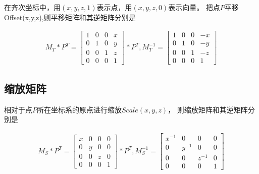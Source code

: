 在齐次坐标中，用$(x,y,z,1)$表示点，用$(x,y,z,0)$表示向量。
把点$P$平移Offset(x,y,z),则平移矩阵和其逆矩阵分别是

\begin{gather*}
    M_{T} \ast P^T = 
    \begin{bmatrix}
        1 & 0 & 0 & x \\ 
        0 & 1 & 0 & y \\
        0 & 0 & 1 & z \\
        0 & 0 & 0 & 1
    \end{bmatrix} \ast P^T, 
    M_{T}^{-1} = 
    \begin{bmatrix}
        1 & 0 & 0 & -x \\ 
        0 & 1 & 0 & -y \\
        0 & 0 & 1 & -z \\
        0 & 0 & 0 & 1
    \end{bmatrix}
\end{gather*}

\subsection{缩放矩阵}

相对于点$P$所在坐标系的原点进行缩放$Scale(x,y,z)$， 则缩放矩阵和其逆矩阵分别是

\begin{gather*}
    M_{S} \ast P^T = 
    \begin{bmatrix}
        x & 0 & 0 & 0 \\ 
        0 & y & 0 & 0 \\
        0 & 0 & z & 0 \\
        0 & 0 & 0 & 1
    \end{bmatrix} \ast P^T,
    M_{S}^{-1} = 
    \begin{bmatrix}
        x^{-1} & 0 & 0 & 0 \\ 
        0 & y^{-1} & 0 & 0 \\
        0 & 0 & z^{-1} & 0 \\
        0 & 0 & 0 & 1
    \end{bmatrix} 
\end{gather*}

